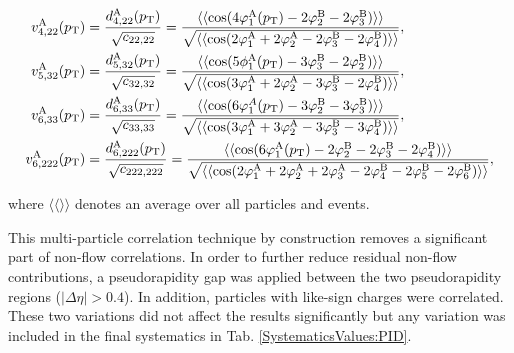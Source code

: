 \documentclass[ALICE,manyauthors]{cernphprep}
\begin{document}
\begin{align}
v_{4,22}^{\rm{A}}(p_{\rm{T}}) &= \frac{d_{4,22}^{\rm{A}}(p_{\rm{T}})}{\sqrt{c_{22,22}}} =  \frac{\langle\langle \cos(4\varphi^{\rm{A}}_{1}(p_{\rm{T}})-2\varphi^{\rm{B}}_{2}-2\varphi^{\rm{B}}_{3})\rangle\rangle}{\sqrt{\langle\langle \cos(2\varphi^{\rm{A}}_{1}+2\varphi^{\rm{A}}_{2}-2\varphi^{\rm{B}}_{3}-2\varphi^{\rm{B}}_{4}) \rangle\rangle}}, \label{Eq:VA422} \\
v_{5,32}^{\rm{A}}(p_{\rm{T}}) &= \frac{d_{5,32}^{\rm{A}}(p_{\rm{T}})}{\sqrt{c_{32,32}}} = \frac{\langle\langle \cos(5\phi^{\rm{A}}_{1}(p_{\rm{T}})-3\varphi^{\rm{B}}_{3}-2\varphi^{\rm{B}}_{2})\rangle\rangle}{\sqrt{\langle\langle \cos(3\varphi^{\rm{A}}_{1}+2\varphi^{\rm{A}}_{2}-3\varphi^{\rm{B}}_{3}-2\varphi^{\rm{B}}_{4}) \rangle\rangle}}, \label{Eq:VA532}\\
v_{6,33}^{\rm{A}}(p_{\rm{T}}) &= \frac{d_{6,33}^{\rm{A}}(p_{\rm{T}})}{\sqrt{c_{33,33}}} =\frac{\langle\langle \cos(6\varphi^{A}_{1}(p_{\rm{T}})-3\varphi^{\rm{B}}_{2}-3\varphi^{\rm{B}}_{3})\rangle\rangle}{\sqrt{\langle\langle \cos(3\varphi^{\rm{A}}_{1}+3\varphi^{\rm{A}}_{2}-3\varphi^{\rm{B}}_{3}-3\varphi^{\rm{B}}_{4}) \rangle\rangle}}, \label{Eq:VA633}\\
v_{6,222}^{\rm{A}}(p_{\rm{T}}) &= \frac{d_{6,222}^{\rm{A}}(p_{\rm{T}})}{\sqrt{c_{222,222}}} =\frac{\langle\langle \cos(6\varphi^{\rm{A}}_{1}(p_{\rm{T}})-2\varphi^{\rm{B}}_{2}-2\varphi^{\rm{B}}_{3}-2\varphi^{\rm{B}}_{4})\rangle\rangle}{\sqrt{\langle\langle \cos(2\varphi^{\rm{A}}_{1}+2\varphi^{\rm{A}}_{2}+2\varphi^{\rm{A}}_{3}-2\varphi^{\rm{B}}_{4}-2\varphi^{\rm{B}}_{5}-2\varphi^{\rm{B}}_{6}) \rangle\rangle}},
\label{Eq:VA6222}
\end{align}

where $\langle\langle\rangle\rangle$ denotes an average over all particles and events.

This multi-particle correlation technique by construction removes a significant part of non-flow correlations. In order to further reduce residual non-flow contributions, a pseudorapidity gap was applied between the two pseudorapidity regions ($|\Delta\eta|>0.4$). In addition, particles with like-sign charges were correlated. These two variations did not affect the results significantly but any variation was included in the final systematics in Tab. \ref{SystematicsValues:PID}.
\end{document}
